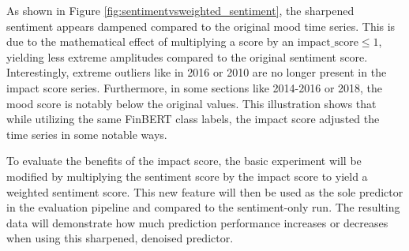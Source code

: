 \documentclass[Master,english,IEEE]{twbook}
\begin{document}
As shown in Figure \ref{fig:sentimentvsweighted_sentiment}, the sharpened sentiment appears dampened compared to the original mood time series. This is due to the mathematical effect of multiplying a score by an $\text{impact\_score} \leq 1$, yielding less extreme amplitudes compared to the original sentiment score. Interestingly, extreme outliers like in 2016 or 2010 are no longer present in the impact score series. Furthermore, in some sections like 2014-2016 or 2018, the mood score is notably below the original values. This illustration shows that while utilizing the same FinBERT class labels, the impact score adjusted the time series in some notable ways.

To evaluate the benefits of the impact score, the basic experiment will be modified by multiplying the sentiment score by the impact score to yield a weighted sentiment score. This new feature will then be used as the sole predictor in the evaluation pipeline and compared to the sentiment-only run. The resulting data will demonstrate how much prediction performance increases or decreases when using this sharpened, denoised predictor.
\end{document}
